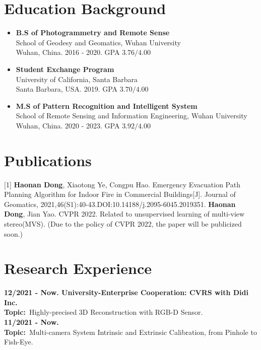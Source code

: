 \documentclass[a4paper]{article}
\begin{document}
\section{Education Background}
\vspace{-0.5em}
\begin{itemize}[itemsep = -0.5em,topsep = 0em]
      \item \textbf{B.S of Photogrammetry and Remote Sense}
            \\ School of Geodesy and Geomatics, Wuhan University\\ Wuhan, China. 2016 - 2020. GPA $3.76/4.00$
      \item \textbf{Student Exchange Program}
            \\ University of California, Santa Barbara\\ Santa Barbara, USA. 2019. GPA $3.70/4.00$
      \item \textbf{M.S of Pattern Recognition and Intelligent System}
            \\ School of Remote Sensing and Information Engineering, Wuhan University\\ Wuhan, China. 2020 - 2023. GPA $3.92/4.00$
\end{itemize}


\section{Publications}
\vspace{-0.5em}
[1] \textbf{Haonan Dong}, Xiaotong Ye, Congpu Hao. Emergency Evacuation Path Planning Algorithm for Indoor Fire in Commercial Buildings[J]. Journal of Geomatics, 2021,46(S1):40-43.DOI:10.14188/j.2095-6045.2019351.
\newline
[2] \textbf{Haonan Dong}, Jian Yao. CVPR 2022. Related to unsupervised learning of multi-view stereo(MVS). (Due to the policy of CVPR 2022, the paper will be publicized soon.)


\section{Research Experience}
\vspace{-0.5em}
\textbf{12/2021 - Now. University-Enterprise Cooperation: CVRS with Didi Inc.}\\
\textbf{Topic:}\ Highly-precised 3D Reconstruction with RGB-D Sensor.\\
\textbf{11/2021 - Now.}\\
\textbf{Topic:}\ Multi-camera System Intrinsic and Extrinsic Calibration, from Pinhole to Fish-Eye.\\
\end{document}
